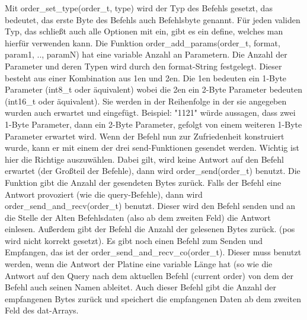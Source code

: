 \documentclass[a4paper]{article}
\begin{document}
	Mit order\_set\_type(order\_t, type) wird der Typ des Befehls gesetzt, das bedeutet, das erste Byte des Befehls auch
	Befehlsbyte genannt. Für jeden validen Typ, das schließt auch alle Optionen mit ein, gibt es ein define, welches man
	hierfür verwenden kann.
	Die Funktion order\_add\_params(order\_t, format, param1, .., paramN) hat eine variable Anzahl an Parametern. Die
	Anzahl der Parameter und deren Typen wird durch den format-String festgelegt. Dieser besteht aus einer Kombination
	aus 1en und 2en. Die 1en bedeuten ein 1-Byte Parameter (int8\_t oder äquivalent) wobei die 2en ein 2-Byte
	Parameter bedeuten (int16\_t oder äquivalent). Sie werden in der Reihenfolge in der sie angegeben wurden auch erwartet
	und eingefügt. Beispiel: "1121" würde aussagen, dass zwei 1-Byte Parameter, dann ein 2-Byte Parameter, gefolgt von
	einem weiteren 1-Byte Parameter erwartet wird.
	Wenn der Befehl nun zur Zufriedenheit konstruiert wurde, kann er mit einem der drei send-Funktionen gesendet werden.
	Wichtig ist hier die Richtige auszuwählen. Dabei gilt, wird keine Antwort auf den Befehl erwartet (der Großteil der
	Befehle), dann wird order\_send(order\_t) benutzt. Die Funktion gibt die Anzahl der gesendeten Bytes zurück.
	Falls der Befehl eine Antwort provoziert (wie die query-Befehle), dann wird order\_send\_and\_recv(order\_t) benutzt.
	Dieser wird den Befehl senden und an die Stelle der Alten Befehlsdaten (also ab dem zweiten Feld) die Antwort einlesen.
	Außerdem gibt der Befehl die Anzahl der gelesenen Bytes zurück. (pos wird nicht korrekt gesetzt).
	Es gibt noch einen Befehl zum Senden und Empfangen, das ist der order\_send\_and\_recv\_co(order\_t). Dieser muss
	benutzt werden, wenn die Antwort der Platine eine variable Länge hat (so wie die Antwort auf den Query nach dem
	aktuellen Befehl (current order) von dem der Befehl auch seinen Namen ableitet. Auch dieser Befehl gibt die Anzahl
	der empfangenen Bytes zurück und speichert die empfangenen Daten ab dem zweiten Feld des dat-Arrays.
\end{document}
